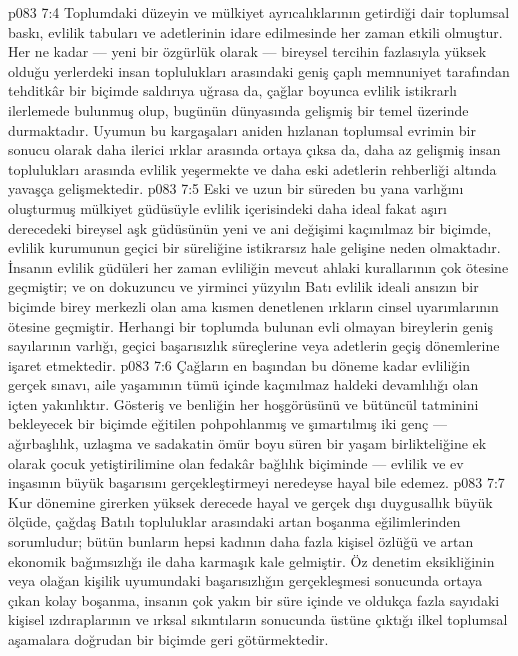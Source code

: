\vs p083 7:4 Toplumdaki düzeyin ve mülkiyet ayrıcalıklarının getirdiği dair toplumsal baskı, evlilik tabuları ve adetlerinin idare edilmesinde her zaman etkili olmuştur. Her ne kadar --- yeni bir özgürlük olarak --- bireysel tercihin fazlasıyla yüksek olduğu yerlerdeki insan toplulukları arasındaki geniş çaplı memnuniyet tarafından tehditkâr bir biçimde saldırıya uğrasa da, çağlar boyunca evlilik istikrarlı ilerlemede bulunmuş olup, bugünün dünyasında gelişmiş bir temel üzerinde durmaktadır. Uyumun bu kargaşaları aniden hızlanan toplumsal evrimin bir sonucu olarak daha ilerici ırklar arasında ortaya çıksa da, daha az gelişmiş insan toplulukları arasında evlilik yeşermekte ve daha eski adetlerin rehberliği altında yavaşça gelişmektedir.
\vs p083 7:5 Eski ve uzun bir süreden bu yana varlığını oluşturmuş mülkiyet güdüsüyle evlilik içerisindeki daha ideal fakat aşırı derecedeki bireysel aşk güdüsünün yeni ve ani değişimi kaçınılmaz bir biçimde, evlilik kurumunun geçici bir süreliğine istikrarsız hale gelişine neden olmaktadır. İnsanın evlilik güdüleri her zaman evliliğin mevcut ahlaki kurallarının çok ötesine geçmiştir; ve on dokuzuncu ve yirminci yüzyılın Batı evlilik ideali ansızın bir biçimde birey merkezli olan ama kısmen denetlenen ırkların cinsel uyarımlarının ötesine geçmiştir. Herhangi bir toplumda bulunan evli olmayan bireylerin geniş sayılarının varlığı, geçici başarısızlık süreçlerine veya adetlerin geçiş dönemlerine işaret etmektedir.
\vs p083 7:6 Çağların en başından bu döneme kadar evliliğin gerçek sınavı, aile yaşamının tümü içinde kaçınılmaz haldeki devamlılığı olan içten yakınlıktır. Gösteriş ve benliğin her hoşgörüsünü ve bütüncül tatminini bekleyecek bir biçimde eğitilen pohpohlanmış ve şımartılmış iki genç --- ağırbaşlılık, uzlaşma ve sadakatin ömür boyu süren bir yaşam birlikteliğine ek olarak çocuk yetiştirilimine olan fedakâr bağlılık biçiminde --- evlilik ve ev inşasının büyük başarısını gerçekleştirmeyi neredeyse hayal bile edemez.
\vs p083 7:7 Kur dönemine girerken yüksek derecede hayal ve gerçek dışı duygusallık büyük ölçüde, çağdaş Batılı topluluklar arasındaki artan boşanma eğilimlerinden sorumludur; bütün bunların hepsi kadının daha fazla kişisel özlüğü ve artan ekonomik bağımsızlığı ile daha karmaşık kale gelmiştir. Öz denetim eksikliğinin veya olağan kişilik uyumundaki başarısızlığın gerçekleşmesi sonucunda ortaya çıkan kolay boşanma, insanın çok yakın bir süre içinde ve oldukça fazla sayıdaki kişisel ızdıraplarının ve ırksal sıkıntıların sonucunda üstüne çıktığı ilkel toplumsal aşamalara doğrudan bir biçimde geri götürmektedir.
